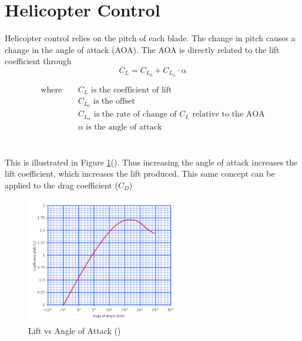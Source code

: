 \section{Helicopter Control} \label{sec:Helicopter_Control}
    Helicopter control relies on the pitch of each blade. The change in pitch causes a change in the angle of attack (AOA). The AOA is directly related to the lift coefficient through \[C_L = C_{L{_0}} +C_{L{_\alpha}} \cdot \alpha\] 
    \begin{minipage}{0.45\textwidth}
        \vspace*{-4mm}
        \begin{align*}
            \text{where} \quad
            &\,C_L \text{ is the coefficient of lift}\\
            &\, C_{L{_0}}\text{ is the offset}  \\
            &\,C_{L{_\alpha}}\text{ is the rate of change of \(C_L\) relative to the AOA}\\
            &\,\alpha \text{ is the angle of attack}\\
        \end{align*}
        \end{minipage}\\

    This is illustrated in Figure \ref{fig:Lift_Vs_AOA}(\cite{angleOfAttackFormula}). Thus increasing the angle of attack increases the lift coefficient, which increases the lift produced. This same concept can be applied to the drag coefficient (\(C_D\)) \\
    \begin{figure} [h]
        \centering
        \includegraphics[width = 0.6\textwidth]{figs/Lift_Vs_AOA.png}
        \caption{Lift vs Angle of Attack (\cite{SKYbary})}
        \label{fig:Lift_Vs_AOA}
    \end{figure}

